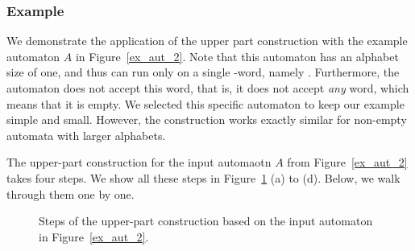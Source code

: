 


\subsubsection{Example}
We demonstrate the application of the upper part construction with the example automaton $A$ in Figure~\ref{ex_aut_2}. Note that this automaton has an alphabet size of one, and thus can run only on a single \om-word, namely \aom. Furthermore, the automaton does not accept this word, that is, it does not accept \textit{any} word, which means that it is empty. We selected this specific automaton to keep our example simple and small. However, the construction works exactly similar for non-empty automata with larger alphabets.

The upper-part construction for the input automaotn $A$ from Figure~\ref{ex_aut_2} takes four steps. We show all these steps in Figure~\ref{steps_upper} (a) to (d). Below, we walk through them one by one.

\begin{figure}[htb]
\centering
  \begin{subfigure}[t]{0.49\textwidth}
  \centering
  \UpperPartA
  \caption{}
  \end{subfigure}
  \hfill
  \begin{subfigure}[t]{0.49\textwidth}
  \centering
  \UpperPartB
  \caption{}
  \end{subfigure}

  \begin{subfigure}[t]{0.49\textwidth}
  \centering
  \UpperPartC
  \caption{}
  \end{subfigure}
  \hfill
  \begin{subfigure}[t]{0.49\textwidth}
  \centering
  \UpperPartD
  \caption{}
  \end{subfigure}
\caption{Steps of the upper-part construction based on the input automaton in Figure~\ref{ex_aut_2}.}
\label{steps_upper}
\end{figure}

